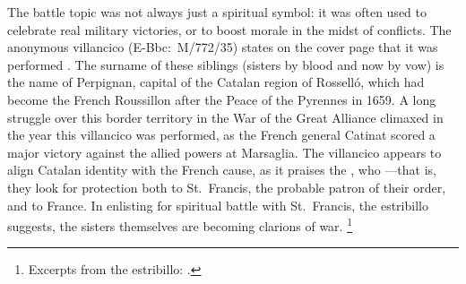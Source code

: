 The battle topic was not always just a spiritual symbol: it was often used to celebrate real military victories, or to boost morale in the midst of conflicts.
The anonymous villancico  (E-Bbc:~M/772/35) states on the cover page that it was performed .
The surname of these siblings (sisters by blood and now by vow) is the name of Perpignan, capital of the Catalan region of Rosselló, which had become the French Roussillon after the Peace of the Pyrennes in 1659.
A long struggle over this border territory in the War of the Great Alliance climaxed in the year this villancico was performed, as the French general Catinat scored a major victory against the allied powers at Marsaglia. %
The villancico appears to align Catalan identity with the French cause, as it praises the , who ---that is, they look for protection both to St.~Francis, the probable patron of their order, and to France.
In enlisting for spiritual battle with St.~Francis, the estribillo suggests, the sisters themselves are becoming clarions of war.%
	\footnote{%
	Excerpts from the estribillo: .
	}

